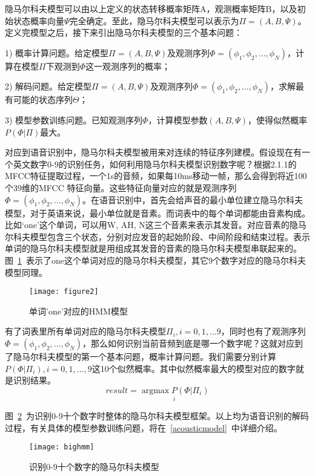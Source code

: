 隐马尔科夫模型可以由以上定义的状态转移概率矩阵A，观测概率矩阵B，以及初始状态概率向量$\Psi$完全确定。至此，隐马尔科夫模型可以表示为$\Pi=(A,B,\Psi)$。定义完模型之后，接下来引出隐马尔科夫模型的三个基本问题：

1) 概率计算问题。给定模型$\Pi=(A,B,\Psi)$及观测序列$\Phi=(\phi_1,\phi_2,...,\phi_N)$，计算在模型$\Pi$下观测到$\Phi$这一观测序列的概率；

2) 解码问题。给定模型$\Pi=(A,B,\Psi)$及观测序列$\Phi=(\phi_1,\phi_2,...,\phi_N)$，求解最有可能的状态序列$\Theta$；

3) 模型参数训练问题。已知观测序列$\Phi$，计算模型参数$(A,B,\Psi)$，使得似然概率$P(\Phi|\Pi)$最大。

对应到语音识别中，隐马尔科夫模型被用来对连续的特征序列建模。假设现在有一个英文数字0-9的识别任务，如何利用隐马尔科夫模型识别数字呢？根据2.1.1的MFCC特征提取过程，一个1s的音频，如果每10ms移动一帧，那么会得到将近100个39维的MFCC 特征向量。这些特征向量对应的就是观测序列$\Phi=(\phi_1,\phi_2,...,\phi_N)$。在语音识别中，首先会给声音的最小单位建立隐马尔科夫模型，对于英语来说，最小单位就是音素。而词表中的每个单词都能由音素构成。比如‘one’这个单词，可以用W, AH, N这三个音素来表示其发音。对应音素的隐马尔科夫模型包含三个状态，分别对应发音的起始阶段、中间阶段和结束过程。表示单词的隐马尔科夫模型就是用组成其发音的音素的隐马尔科夫模型串联起来的。图~\ref{fig:figure2}~表示了one这个单词对应的隐马尔科夫模型，其它9个数字对应的隐马尔科夫模型同理。
\begin{figure}[htbp]
\centering
\texttt{[image: figure2]}
\caption{单词'one'对应的HMM模型}\label{fig:figure2}
\vspace{\baselineskip}
\end{figure}

有了词表里所有单词对应的隐马尔科夫模型$\Pi_i,i=0,1,...9$，同时也有了观测序列$\Phi=(\phi_1,\phi_2,...,\phi_N)$，那么如何识别当前音频到底是哪一个数字呢？这就对应到了隐马尔科夫模型的第一个基本问题，概率计算问题。我们需要分别计算$P(\Phi|\Pi_i), i=0,1,...,9$这10个似然概率。其中似然概率最大的模型对应的数字就是识别结果。\begin{equation}result=\underset{i}{\operatorname{argmax} P(\Phi|\Pi_i)} \end{equation}

图~\ref{fig:bighmm}~为识别0-9十个数字时整体的隐马尔科夫模型框架。以上均为语音识别的解码过程，有关具体的模型参数训练问题，将在~\ref{acousticmodel}~中详细介绍。
\begin{figure}[htbp]
\centering
\texttt{[image: bighmm]}
\caption{识别0-9十个数字的隐马尔科夫模型}\label{fig:bighmm}
\vspace{\baselineskip}
\end{figure}


